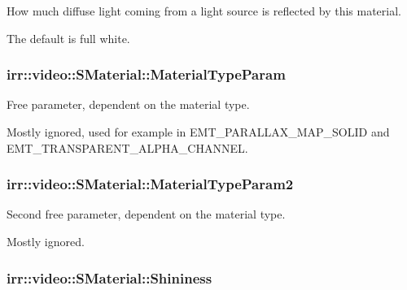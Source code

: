 How much diffuse light coming from a light source is reflected by this material. 

The default is full white. 
\subsubsection[{\texorpdfstring{Material\+Type\+Param}{MaterialTypeParam}}]{ irr\+::video\+::\+S\+Material\+::\+Material\+Type\+Param}\hypertarget{classirr_1_1video_1_1SMaterial_aefe0acce491efa8dedcd2b7cb49f8133}{}\label{classirr_1_1video_1_1SMaterial_aefe0acce491efa8dedcd2b7cb49f8133}


Free parameter, dependent on the material type. 

Mostly ignored, used for example in E\+M\+T\+\_\+\+P\+A\+R\+A\+L\+L\+A\+X\+\_\+\+M\+A\+P\+\_\+\+S\+O\+L\+ID and E\+M\+T\+\_\+\+T\+R\+A\+N\+S\+P\+A\+R\+E\+N\+T\+\_\+\+A\+L\+P\+H\+A\+\_\+\+C\+H\+A\+N\+N\+EL. 
\subsubsection[{\texorpdfstring{Material\+Type\+Param2}{MaterialTypeParam2}}]{ irr\+::video\+::\+S\+Material\+::\+Material\+Type\+Param2}\hypertarget{classirr_1_1video_1_1SMaterial_a3c4af8e0325a95ff78c3066a497161de}{}\label{classirr_1_1video_1_1SMaterial_a3c4af8e0325a95ff78c3066a497161de}


Second free parameter, dependent on the material type. 

Mostly ignored. 
\subsubsection[{\texorpdfstring{Shininess}{Shininess}}]{ irr\+::video\+::\+S\+Material\+::\+Shininess}\hypertarget{classirr_1_1video_1_1SMaterial_a877106a83108db6d1f30a38379d28494}{}\label{classirr_1_1video_1_1SMaterial_a877106a83108db6d1f30a38379d28494}



